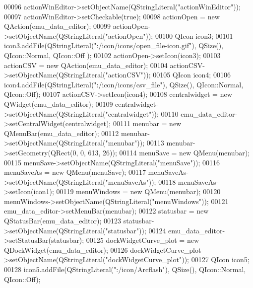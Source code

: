\begin{DoxyCode}
00096         actionWinEditor->setObjectName(QStringLiteral(\textcolor{stringliteral}{"actionWinEditor"}));
00097         actionWinEditor->setCheckable(\textcolor{keyword}{true});
00098         actionOpen = \textcolor{keyword}{new} QAction(emu\_data\_editor);
00099         actionOpen->setObjectName(QStringLiteral(\textcolor{stringliteral}{"actionOpen"}));
00100         QIcon icon3;
00101         icon3.addFile(QStringLiteral(\textcolor{stringliteral}{":/icon/icons/open\_file-icon.gif"}), QSize(), QIcon::Normal, QIcon::Off
      );
00102         actionOpen->setIcon(icon3);
00103         actionCSV = \textcolor{keyword}{new} QAction(emu\_data\_editor);
00104         actionCSV->setObjectName(QStringLiteral(\textcolor{stringliteral}{"actionCSV"}));
00105         QIcon icon4;
00106         icon4.addFile(QStringLiteral(\textcolor{stringliteral}{":/icon/icons/csv\_file"}), QSize(), QIcon::Normal, QIcon::Off);
00107         actionCSV->setIcon(icon4);
00108         centralwidget = \textcolor{keyword}{new} QWidget(emu\_data\_editor);
00109         centralwidget->setObjectName(QStringLiteral(\textcolor{stringliteral}{"centralwidget"}));
00110         emu\_data\_editor->setCentralWidget(centralwidget);
00111         menubar = \textcolor{keyword}{new} QMenuBar(emu\_data\_editor);
00112         menubar->setObjectName(QStringLiteral(\textcolor{stringliteral}{"menubar"}));
00113         menubar->setGeometry(QRect(0, 0, 613, 26));
00114         menuSave = \textcolor{keyword}{new} QMenu(menubar);
00115         menuSave->setObjectName(QStringLiteral(\textcolor{stringliteral}{"menuSave"}));
00116         menuSaveAs = \textcolor{keyword}{new} QMenu(menuSave);
00117         menuSaveAs->setObjectName(QStringLiteral(\textcolor{stringliteral}{"menuSaveAs"}));
00118         menuSaveAs->setIcon(icon1);
00119         menuWindows = \textcolor{keyword}{new} QMenu(menubar);
00120         menuWindows->setObjectName(QStringLiteral(\textcolor{stringliteral}{"menuWindows"}));
00121         emu\_data\_editor->setMenuBar(menubar);
00122         statusbar = \textcolor{keyword}{new} QStatusBar(emu\_data\_editor);
00123         statusbar->setObjectName(QStringLiteral(\textcolor{stringliteral}{"statusbar"}));
00124         emu\_data\_editor->setStatusBar(statusbar);
00125         dockWidgetCurve\_plot = \textcolor{keyword}{new} QDockWidget(emu\_data\_editor);
00126         dockWidgetCurve\_plot->setObjectName(QStringLiteral(\textcolor{stringliteral}{"dockWidgetCurve\_plot"}));
00127         QIcon icon5;
00128         icon5.addFile(QStringLiteral(\textcolor{stringliteral}{":/icon/Arcflash"}), QSize(), QIcon::Normal, QIcon::Off);

\end{DoxyCode}
